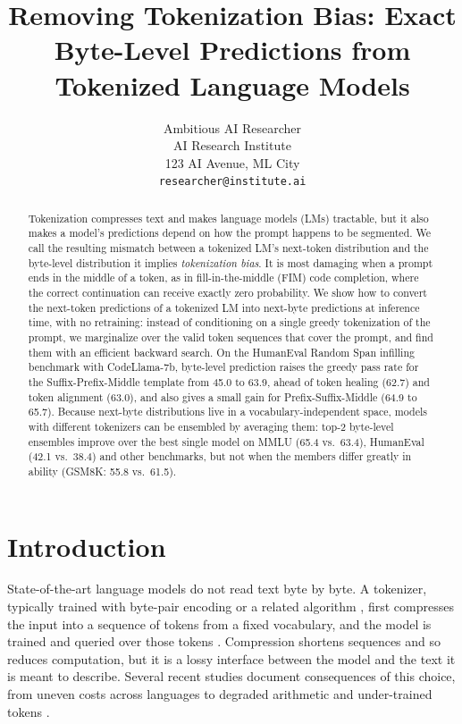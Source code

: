 \documentclass{article} %
\title{Removing Tokenization Bias: Exact Byte-Level Predictions from Tokenized Language Models}
\author{Ambitious AI Researcher\\
AI Research Institute\\
123 AI Avenue, ML City\\
\texttt{researcher@institute.ai}
}
\begin{document}
\maketitle

\begin{abstract}
Tokenization compresses text and makes language models (LMs) tractable, but it also makes a model's predictions depend on how the prompt happens to be segmented. We call the resulting mismatch between a tokenized LM's next-token distribution and the byte-level distribution it implies \emph{tokenization bias}. It is most damaging when a prompt ends in the middle of a token, as in fill-in-the-middle (FIM) code completion, where the correct continuation can receive exactly zero probability. We show how to convert the next-token predictions of a tokenized LM into next-byte predictions at inference time, with no retraining: instead of conditioning on a single greedy tokenization of the prompt, we marginalize over the valid token sequences that cover the prompt, and find them with an efficient backward search. On the HumanEval Random Span infilling benchmark with CodeLlama-7b, byte-level prediction raises the greedy pass rate for the Suffix-Prefix-Middle template from 45.0 to 63.9, ahead of token healing (62.7) and token alignment (63.0), and also gives a small gain for Prefix-Suffix-Middle (64.9 to 65.7). Because next-byte distributions live in a vocabulary-independent space, models with different tokenizers can be ensembled by averaging them: top-2 byte-level ensembles improve over the best single model on MMLU (65.4 vs.\ 63.4), HumanEval (42.1 vs.\ 38.4) and other benchmarks, but not when the members differ greatly in ability (GSM8K: 55.8 vs.\ 61.5).
\end{abstract}

\section{Introduction}
\label{sec:intro}
State-of-the-art language models do not read text byte by byte. A tokenizer, typically trained with byte-pair encoding \citep{gage1994bpe,sennrich2016bpe} or a related algorithm \citep{kudo2018sentencepiece}, first compresses the input into a sequence of tokens from a fixed vocabulary, and the model is trained and queried over those tokens \citep{brown2020gpt3,touvron2023llama2}. Compression shortens sequences and so reduces computation, but it is a lossy interface between the model and the text it is meant to describe. Several recent studies document consequences of this choice, from uneven costs across languages \citep{petrov2023unfairness} to degraded arithmetic \citep{singh2024tokenization} and under-trained tokens \citep{land2024magikarp}.
\end{document}
